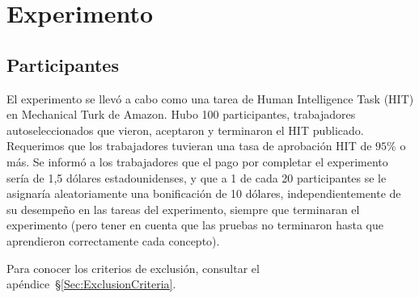 
\section{Experimento}\label{Section:Experiment}

\subsection{Participantes} \label{Participants}

El experimento se llevó a cabo como una tarea de Human Intelligence Task (HIT) en Mechanical Turk \cite{crump2013evaluating, buhrmester2011amazon, stewart2015average} de Amazon. Hubo 100 participantes, trabajadores autoseleccionados que vieron, aceptaron y terminaron el HIT publicado. Requerimos que los trabajadores tuvieran una tasa de aprobación HIT de $95 \%$ o más. Se informó a los trabajadores que el pago por completar el experimento sería de {1,5} dólares estadounidenses,
y que a 1 de cada 20 participantes se le asignaría aleatoriamente una bonificación de 10 dólares, independientemente de su desempeño en las tareas del experimento, siempre que terminaran el experimento (pero tener en cuenta que las pruebas no terminaron hasta que aprendieron correctamente cada concepto).

Para conocer los criterios de exclusión, consultar el apéndice~\S\ref{Sec:ExclusionCriteria}.


